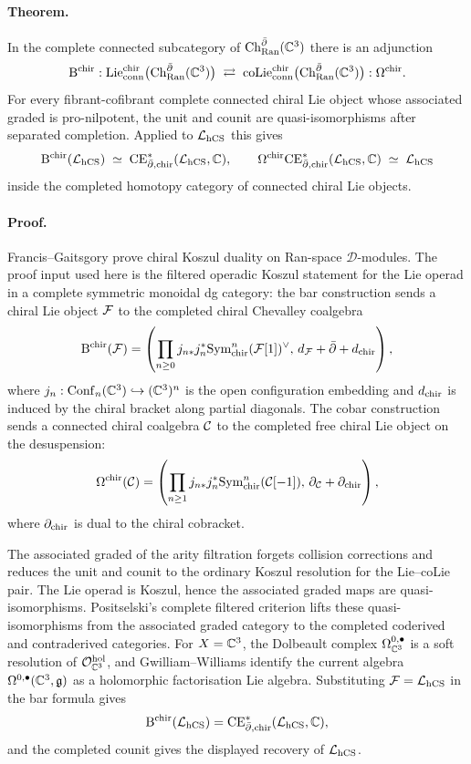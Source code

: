 \paragraph{Theorem.}
In the complete connected subcategory of
$\mathrm{Ch}_{\mathrm{Ran}}^{\bar\partial}(\mathbb{C}^3)$ there is an adjunction
\[
  \mathrm{B}^{\mathrm{chir}}:\mathrm{Lie}^{\mathrm{chir}}_{\mathrm{conn}}
       \bigl(\mathrm{Ch}_{\mathrm{Ran}}^{\bar\partial}(\mathbb{C}^3)\bigr)
  \;\rightleftarrows\;
  \mathrm{coLie}^{\mathrm{chir}}_{\mathrm{conn}}
       \bigl(\mathrm{Ch}_{\mathrm{Ran}}^{\bar\partial}(\mathbb{C}^3)\bigr):\Omega^{\mathrm{chir}}.
\]
For every fibrant-cofibrant complete connected chiral Lie object whose
associated graded is pro-nilpotent, the unit and counit are
quasi-isomorphisms after separated completion.  Applied to
$\mathcal{L}_{\mathrm{hCS}}$ this gives
\[
  \mathrm{B}^{\mathrm{chir}}(\mathcal{L}_{\mathrm{hCS}})
   \;\simeq\;
  \mathrm{CE}^*_{\bar\partial,\mathrm{chir}}(\mathcal{L}_{\mathrm{hCS}},\mathbb{C}),
  \qquad
  \Omega^{\mathrm{chir}}\mathrm{CE}^*_{\bar\partial,\mathrm{chir}}(\mathcal{L}_{\mathrm{hCS}},\mathbb{C})
   \;\simeq\;
  \mathcal{L}_{\mathrm{hCS}}
\]
inside the completed homotopy category of connected chiral Lie
objects.

\paragraph{Proof.}
Francis--Gaitsgory prove chiral Koszul duality on Ran-space
$\mathcal D$-modules.  The proof input used here is the filtered
operadic Koszul statement for the Lie operad in a complete symmetric
monoidal dg category: the bar construction sends a chiral Lie object
$\mathcal{F}$ to the completed chiral Chevalley coalgebra
\[
  \mathrm{B}^{\mathrm{chir}}(\mathcal{F})
  =
  \left(
    \prod_{n\geq 0}
    j_{n*}j_n^*
    \mathrm{Sym}^n_{\mathrm{chir}}(\mathcal{F}[1])^\vee,\,
    d_{\mathcal{F}}+\bar\partial+d_{\mathrm{chir}}
  \right),
\]
where $j_n:\operatorname{Conf}_n(\mathbb{C}^3)\hookrightarrow(\mathbb{C}^3)^n$ is the
open configuration embedding and $d_{\mathrm{chir}}$ is induced by the chiral
bracket along partial diagonals.  The cobar construction sends a
connected chiral coalgebra $\mathcal{C}$ to the completed free chiral Lie object
on the desuspension:
\[
  \Omega^{\mathrm{chir}}(\mathcal{C})
  =
  \left(
    \prod_{n\geq 1}
    j_{n*}j_n^*
    \mathrm{Sym}^n_{\mathrm{chir}}(\mathcal{C}[-1]),\,
    \partial_{\mathcal{C}}+\partial_{\mathrm{chir}}
  \right),
\]
where $\partial_{\mathrm{chir}}$ is dual to the chiral cobracket.

The associated graded of the arity filtration forgets collision
corrections and reduces the unit and counit to the ordinary Koszul
resolution for the Lie--coLie pair.  The Lie operad is Koszul, hence
the associated graded maps are quasi-isomorphisms.  Positselski's
complete filtered criterion lifts these quasi-isomorphisms from the
associated graded category to the completed coderived and
contraderived categories.  For $X=\mathbb{C}^3$, the Dolbeault complex
$\Omega^{0,\bullet}_{\mathbb{C}^3}$ is a soft resolution of
$\mathcal{O}_{\mathbb{C}^3}^{\mathrm{hol}}$, and Gwilliam--Williams identify the
current algebra $\Omega^{0,\bullet}(\mathbb{C}^3,\mathfrak{g})$ as a holomorphic
factorisation Lie algebra.  Substituting $\mathcal{F}=\mathcal{L}_{\mathrm{hCS}}$ in the bar
formula gives
\[
  \mathrm{B}^{\mathrm{chir}}(\mathcal{L}_{\mathrm{hCS}})
  =
  \mathrm{CE}^*_{\bar\partial,\mathrm{chir}}(\mathcal{L}_{\mathrm{hCS}},\mathbb{C}),
\]
and the completed counit gives the displayed recovery of
$\mathcal{L}_{\mathrm{hCS}}$.

